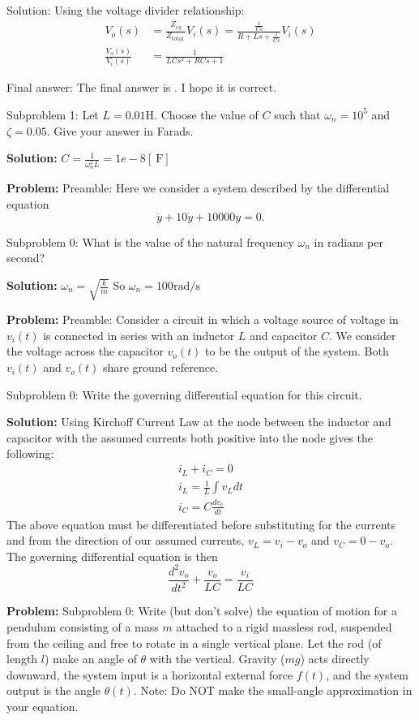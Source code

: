 \documentclass[10pt]{article}
\begin{document}
Solution: Using the voltage divider relationship:
\[
\begin{aligned}
V_{o}(s) &=\frac{Z_{e q}}{Z_{\text {total }}}V_{i}(s)=\frac{\frac{1}{C s}}{R+L s+\frac{1}{C s}} V_{i}(s) \\
\frac{V_{o}(s)}{V_{i}(s)} &=\boxed{\frac{1}{L C s^{2}+R C s+1}}
\end{aligned}
\]

Final answer: The final answer is . I hope it is correct.

Subproblem 1: Let \(L=0.01 \mathrm{H}\). Choose the value of $C$ such that \(\omega_{n}=10^{5}\) and \(\zeta=0.05\).  Give your answer in Farads.


\textbf{Solution:}
$C=\frac{1}{\omega_{n}^{2}L}=\boxed{1e-8}[\mathrm{~F}]$


\textbf{Problem:}
Preamble: Here we consider a system described by the differential equation
\[
\ddot{y}+10 \dot{y}+10000 y=0 .
\]

Subproblem 0: What is the value of the natural frequency \(\omega_{n}\) in radians per second?


\textbf{Solution:}
$\omega_{n}=\sqrt{\frac{k}{m}}$
So
$\omega_{n} =\boxed{100} \mathrm{rad} / \mathrm{s}$


\textbf{Problem:}
Preamble: Consider a circuit in which a voltage source of voltage in $v_{i}(t)$ is connected in series with an inductor $L$ and capacitor $C$.  We consider the voltage across the capacitor $v_{o}(t)$ to be the output of the system.
Both $v_{i}(t)$ and $v_{o}(t)$ share ground reference.

Subproblem 0: Write the governing differential equation for this circuit.


\textbf{Solution:}
Using Kirchoff Current Law at the node between the inductor and capacitor with the assumed currents both positive into the node gives the following:
\[
\begin{gathered}
i_{L}+i_{C}=0 \\
i_{L}=\frac{1}{L} \int v_{L} d t \\
i_{C}=C \frac{d v_{c}}{d t}
\end{gathered}
\]
The above equation must be differentiated before substituting for the currents and from the direction of our assumed currents, \(v_{L}=v_{i}-v_{o}\) and \(v_{C}=0-v_{o}\). The governing differential equation is then
\[
\boxed{\frac{d^{2} v_{o}}{d t^{2}}+\frac{v_{o}}{L C}=\frac{v_{i}}{L C}}
\]


\textbf{Problem:}
Subproblem 0: Write (but don't solve) the equation of motion for a pendulum consisting of a mass $m$ attached to a rigid massless rod, suspended from the ceiling and free to rotate in a single vertical plane.  Let the rod (of length $l$) make an angle of $\theta$ with the vertical.  Gravity ($mg$) acts directly downward, the system input is a horizontal external force $f(t)$, and the system output is the angle $\theta(t)$.  
Note: Do NOT make the small-angle approximation in your equation.
\end{document}
